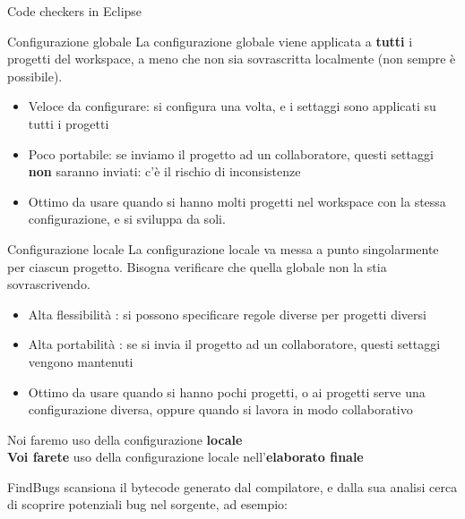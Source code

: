 \documentclass[presentation]{beamer}
\begin{document}
\begin{frame}[allowframebreaks]{Code checkers in Eclipse}
	\begin{block}{Configurazione globale}
	La configurazione globale viene applicata a \textbf{tutti} i progetti del workspace, a meno che non sia sovrascritta localmente (non sempre è possibile).
		\begin{itemize}
			\item Veloce da configurare: si configura una volta, e i settaggi sono applicati su tutti i progetti
			\item Poco portabile: se inviamo il progetto ad un collaboratore, questi settaggi \textbf{non} saranno inviati: c'è il rischio di inconsistenze
			\item Ottimo da usare quando si hanno molti progetti nel workspace con la stessa configurazione, e si sviluppa da soli.
		\end{itemize}
	\end{block}
	\begin{block}{Configurazione locale}
	La configurazione locale va messa a punto singolarmente per ciascun progetto. Bisogna verificare che quella globale non la stia sovrascrivendo.
		\begin{itemize}
			\item Alta flessibilità : si possono specificare regole diverse per progetti diversi
			\item Alta portabilità : se si invia il progetto ad un collaboratore, questi settaggi vengono mantenuti
			\item Ottimo da usare quando si hanno pochi progetti, o ai progetti serve una configurazione diversa, oppure quando si lavora in modo collaborativo
		\end{itemize}
	\end{block}
	\begin{center}
		Noi faremo uso della configurazione \textbf{locale} \\
		\textbf{Voi farete} uso della configurazione locale nell'\textbf{elaborato finale}
	\end{center}

\end{frame}

 {
   {
      FindBugs scansiona il bytecode generato dal compilatore, e dalla sua analisi cerca di scoprire potenziali bug nel sorgente, ad esempio:
  }
}
\end{document}
